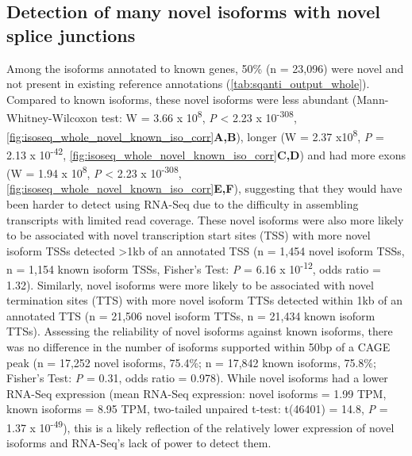\subsection{Detection of many novel isoforms with novel splice junctions}
\label{sec:whole_novelIso}
Among the isoforms annotated to known genes, 50\% (n = 23,096) were novel and not present in existing reference annotations (\cref{tab:sqanti_output_whole}). Compared to known isoforms, these novel isoforms were less abundant (Mann-Whitney-Wilcoxon test: W = 3.66 x 10\textsuperscript{8}, \textit{P} < 2.23 x 10\textsuperscript{-308}, \cref{fig:isoseq_whole_novel_known_iso_corr}\textbf{A,B}), longer (W = 2.37 x10\textsuperscript{8}, \textit{P} = 2.13 x 10\textsuperscript{-42}, \cref{fig:isoseq_whole_novel_known_iso_corr}\textbf{C,D}) and had more exons (W = 1.94 x 10\textsuperscript{8}, \textit{P} < 2.23 x 10\textsuperscript{-308}, \cref{fig:isoseq_whole_novel_known_iso_corr}\textbf{E,F}), suggesting that they would have been harder to detect using RNA-Seq due to the difficulty in assembling transcripts with limited read coverage. These novel isoforms were also more likely to be associated with novel transcription start sites (TSS) with more novel isoform TSSs detected >1kb of an annotated TSS (n = 1,454 novel isoform TSSs, n = 1,154 known isoform TSSs, Fisher's Test: \textit{P} = 6.16 x 10\textsuperscript{-12}, odds ratio = 1.32). Similarly, novel isoforms were more likely to be associated with novel termination sites (TTS) with more novel isoform TTSs detected within 1kb of an annotated TTS (n = 21,506 novel isoform TTSs, n = 21,434 known isoform TTSs). Assessing the reliability of novel isoforms against known isoforms, there was no difference in the number of isoforms supported within 50bp of a CAGE peak (n = 17,252 novel isoforms, 75.4\%; n =  17,842 known isoforms, 75.8\%; Fisher's Test: \textit{P} = 0.31, odds ratio = 0.978). While novel isoforms had a lower RNA-Seq expression (mean RNA-Seq expression: novel isoforms = 1.99 TPM, known isoforms = 8.95 TPM, two-tailed unpaired t-test: t(46401) = 14.8, \textit{P} = 1.37 x 10\textsuperscript{-49}), this is a likely reflection of the relatively lower expression of novel isoforms and RNA-Seq's lack of power to detect them.


